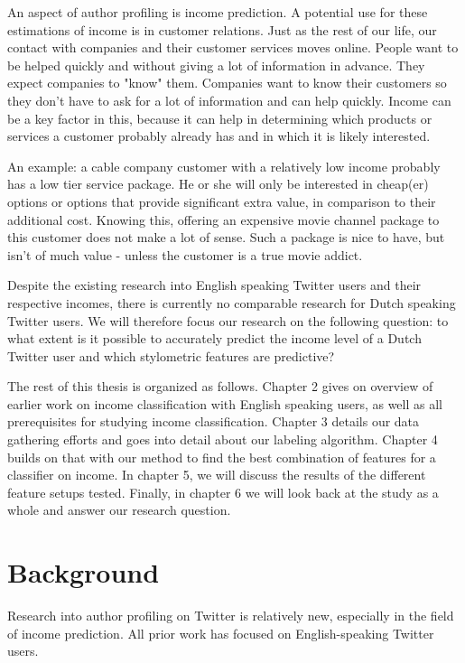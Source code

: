 \documentclass[
10pt, %
a4paper, %
oneside, %
headinclude,footinclude, %
] {book}%
\begin{document}
An aspect of author profiling is income prediction. A potential use for these estimations of income is in customer relations. Just as the rest of our life, our contact with companies and their customer services moves online. People want to be helped quickly and without giving a lot of information in advance. They expect companies to "know" them. Companies want to know their customers so they don't have to ask for a lot of information and can help quickly. Income can be a key factor in this, because it can help in determining which products or services a customer probably already has and in which it is likely interested.

An example: a cable company customer with a relatively low income probably has a low tier service package. He or she will only be interested in cheap(er) options or options that provide significant extra value, in comparison to their additional cost. Knowing this, offering an expensive movie channel package to this customer does not make a lot of sense. Such a package is nice to have, but isn't of much value - unless the customer is a true movie addict.


Despite the existing research into English speaking Twitter users and their respective incomes, there is currently no comparable research for Dutch speaking Twitter users. We will therefore focus our research on the following question: to what extent is it possible to accurately predict the income level of a Dutch Twitter user and which stylometric features are predictive?

The rest of this thesis is organized as follows. Chapter 2 gives on overview of earlier work on income classification with English speaking users, as well as all prerequisites for studying income classification. Chapter 3 details our data gathering efforts and goes into detail about our labeling algorithm. Chapter 4 builds on that with our method to find the best combination of features for a classifier on income. In chapter 5, we will discuss the results of the different feature setups tested. Finally, in chapter 6 we will look back at the study as a whole and answer our research question.

\chapter{Background}
Research into author profiling on Twitter is relatively new, especially in the field of income prediction. All prior work has focused on English-speaking Twitter users.
\end{document}
